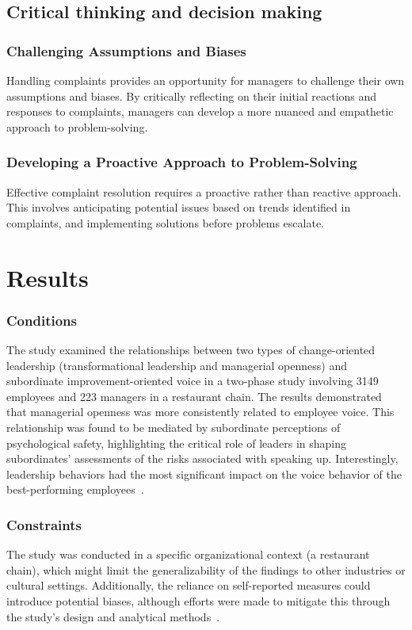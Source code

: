 \documentclass[runningheads]{llncs}
\begin{document}
\subsection{Critical thinking and decision making}
\subsubsection{Challenging Assumptions and Biases}
Handling complaints provides an opportunity for managers to challenge their own assumptions and biases. By critically reflecting on their initial reactions and responses to complaints, managers can develop a more nuanced and empathetic approach to problem-solving.

\subsubsection{Developing a Proactive Approach to Problem-Solving}
Effective complaint resolution requires a proactive rather than reactive approach. This involves anticipating potential issues based on trends identified in complaints, and implementing solutions before problems escalate. 

\section{Results}
 
\subsubsection{Conditions}
The study examined the relationships between two types of change-oriented leadership (transformational leadership and managerial openness) and subordinate improvement-oriented voice in a two-phase study involving 3149 employees and 223 managers in a restaurant chain. The results demonstrated that managerial openness was more consistently related to employee voice. This relationship was found to be mediated by subordinate perceptions of psychological safety, highlighting the critical role of leaders in shaping subordinates' assessments of the risks associated with speaking up. Interestingly, leadership behaviors had the most significant impact on the voice behavior of the best-performing employees~\cite{detert2007leadership}.
\subsubsection{Constraints}
The study was conducted in a specific organizational context (a restaurant chain), which might limit the generalizability of the findings to other industries or cultural settings. Additionally, the reliance on self-reported measures could introduce potential biases, although efforts were made to mitigate this through the study's design and analytical methods~\cite{detert2007leadership}.
\end{document}

